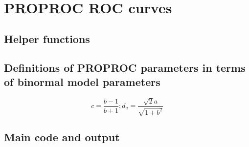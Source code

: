 \documentclass[
]{book}
\begin{document}
\hypertarget{proproc-rocs}{%
\chapter{PROPROC ROC curves}\label{proproc-rocs}}

\hypertarget{helper-functions}{%
\section{Helper functions}\label{helper-functions}}

\hypertarget{definitions-of-proproc-parameters-in-terms-of-binormal-model-parameters}{%
\section{Definitions of PROPROC parameters in terms of binormal model parameters}\label{definitions-of-proproc-parameters-in-terms-of-binormal-model-parameters}}

\[c=\frac{b-1}{b+1};{{d}_{a}}=\frac{\sqrt{2}a}{\sqrt{1+{{b}^{2}}}}\]

\hypertarget{main-code-and-output}{%
\section{Main code and output}\label{main-code-and-output}}
\end{document}
